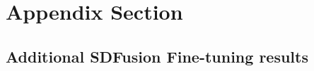 \section{Appendix Section}
\label{sec:appendix_section}

\subsection{Additional SDFusion Fine-tuning results}
\label{sec:appendic_fine_tuning}

